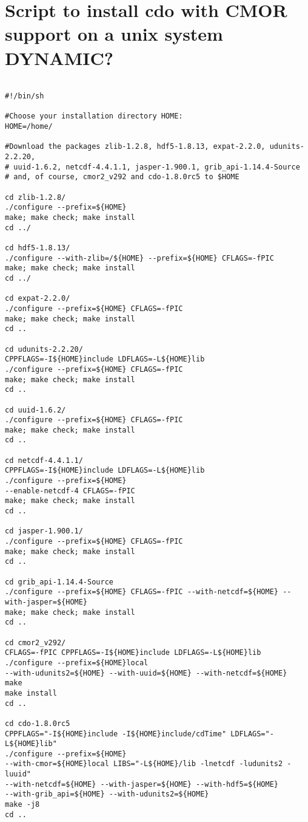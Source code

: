 \chapter{Script to install cdo with CMOR support on a unix system DYNAMIC?}
\label{chap:Script}

\begin{verbatim}

#!/bin/sh

#Choose your installation directory HOME:
HOME=/home/

#Download the packages zlib-1.2.8, hdf5-1.8.13, expat-2.2.0, udunits-2.2.20, 
# uuid-1.6.2, netcdf-4.4.1.1, jasper-1.900.1, grib_api-1.14.4-Source
# and, of course, cmor2_v292 and cdo-1.8.0rc5 to $HOME

cd zlib-1.2.8/
./configure --prefix=${HOME}
make; make check; make install
cd ../

cd hdf5-1.8.13/
./configure --with-zlib=/${HOME} --prefix=${HOME} CFLAGS=-fPIC
make; make check; make install
cd ../

cd expat-2.2.0/
./configure --prefix=${HOME} CFLAGS=-fPIC
make; make check; make install
cd ..

cd udunits-2.2.20/
CPPFLAGS=-I${HOME}include LDFLAGS=-L${HOME}lib 
./configure --prefix=${HOME} CFLAGS=-fPIC
make; make check; make install
cd ..

cd uuid-1.6.2/
./configure --prefix=${HOME} CFLAGS=-fPIC
make; make check; make install
cd ..

cd netcdf-4.4.1.1/
CPPFLAGS=-I${HOME}include LDFLAGS=-L${HOME}lib 
./configure --prefix=${HOME} 
--enable-netcdf-4 CFLAGS=-fPIC
make; make check; make install
cd ..

cd jasper-1.900.1/
./configure --prefix=${HOME} CFLAGS=-fPIC
make; make check; make install
cd ..

cd grib_api-1.14.4-Source
./configure --prefix=${HOME} CFLAGS=-fPIC --with-netcdf=${HOME} --with-jasper=${HOME}
make; make check; make install
cd ..

cd cmor2_v292/
CFLAGS=-fPIC CPPFLAGS=-I${HOME}include LDFLAGS=-L${HOME}lib 
./configure --prefix=${HOME}local
--with-udunits2=${HOME} --with-uuid=${HOME} --with-netcdf=${HOME}
make
make install
cd ..

cd cdo-1.8.0rc5
CPPFLAGS="-I${HOME}include -I${HOME}include/cdTime" LDFLAGS="-L${HOME}lib"
./configure --prefix=${HOME}
--with-cmor=${HOME}local LIBS="-L${HOME}/lib -lnetcdf -ludunits2 -luuid"
--with-netcdf=${HOME} --with-jasper=${HOME} --with-hdf5=${HOME} 
--with-grib_api=${HOME} --with-udunits2=${HOME}
make -j8
cd ..


\end{verbatim}